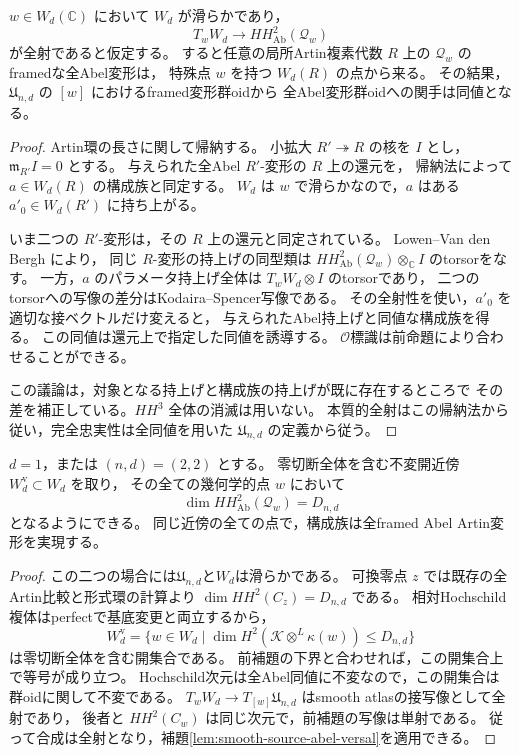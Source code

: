 \begin{lemma}[滑らかな表示と全射な接写像によるAbel持上げ]
\label{lem:smooth-source-abel-versal}
$w\in W_d(\mathbb C)$ において $W_d$ が滑らかであり，
\[
 T_wW_d\longrightarrow HH^2_{\mathrm{Ab}}(\mathcal Q_w)
\]
が全射であると仮定する。
すると任意の局所Artin複素代数 $R$ 上の
$\mathcal Q_w$ のframedな全Abel変形は，
特殊点 $w$ を持つ $W_d(R)$ の点から来る。
その結果，$\mathfrak U_{n,d}$ の $[w]$ におけるframed変形群oidから
全Abel変形群oidへの関手は同値となる。
\end{lemma}
\begin{proof}
Artin環の長さに関して帰納する。
小拡大 $R'\twoheadrightarrow R$ の核を $I$ とし，
$\mathfrak m_{R'}I=0$ とする。
与えられた全Abel $R'$-変形の $R$ 上の還元を，
帰納法によって $a\in W_d(R)$ の構成族と同定する。
$W_d$ は $w$ で滑らかなので，$a$ はある $a'_0\in W_d(R')$ に持ち上がる。

いま二つの $R'$-変形は，その $R$ 上の還元と同定されている。
Lowen--Van den Bergh \cite[Theorem~3.1]{LowenVdBHochschild}により，
同じ $R$-変形の持上げの同型類は
$HH^2_{\mathrm{Ab}}(\mathcal Q_w)\otimes_{\mathbb C}I$ のtorsorをなす。
一方，$a$ のパラメータ持上げ全体は $T_wW_d\otimes I$ のtorsorであり，
二つのtorsorへの写像の差分はKodaira--Spencer写像である。
その全射性を使い，$a'_0$ を適切な接ベクトルだけ変えると，
与えられたAbel持上げと同値な構成族を得る。
この同値は還元上で指定した同値を誘導する。
$\mathcal O$標識は前命題により合わせることができる。

この議論は，対象となる持上げと構成族の持上げが既に存在するところで
その差を補正している。$HH^3$ 全体の消滅は用いない。
本質的全射はこの帰納法から従い，完全忠実性は全同値を用いた
$\mathfrak U_{n,d}$ の定義から従う。
\end{proof}

\begin{proposition}[滑らかな二つの場合の零切断近傍]
\label{prop:smooth-types-abel-versal}
$d=1$，または $(n,d)=(2,2)$ とする。
零切断全体を含む不変開近傍 $W_d^{\mathrm v}\subset W_d$ を取り，
その全ての幾何学的点 $w$ において
\[
 \dim HH^2_{\mathrm{Ab}}(\mathcal Q_w)=D_{n,d}
\]
となるようにできる。
同じ近傍の全ての点で，構成族は全framed Abel Artin変形を実現する。
\end{proposition}
\begin{proof}
この二つの場合には$\mathfrak U_{n,d}$と$W_d$は滑らかである。
可換零点 $z$ では既存の全Artin比較と形式環の計算より
$\dim HH^2(C_z)=D_{n,d}$ である。
相対Hochschild複体はperfectで基底変更と両立するから，
\[
 W_d^{\mathrm v}
   =\{w\in W_d\mid\dim H^2(\mathcal K\otimes^L\kappa(w))\le D_{n,d}\}
\]
は零切断全体を含む開集合である。
前補題の下界と合わせれば，この開集合上で等号が成り立つ。
Hochschild次元は全Abel同値に不変なので，この開集合は群oidに関して不変である。
$T_wW_d\to T_{[w]}\mathfrak U_{n,d}$ はsmooth atlasの接写像として全射であり，
後者と $HH^2(C_w)$ は同じ次元で，前補題の写像は単射である。
従って合成は全射となり，補題\ref{lem:smooth-source-abel-versal}を適用できる。
\end{proof}



